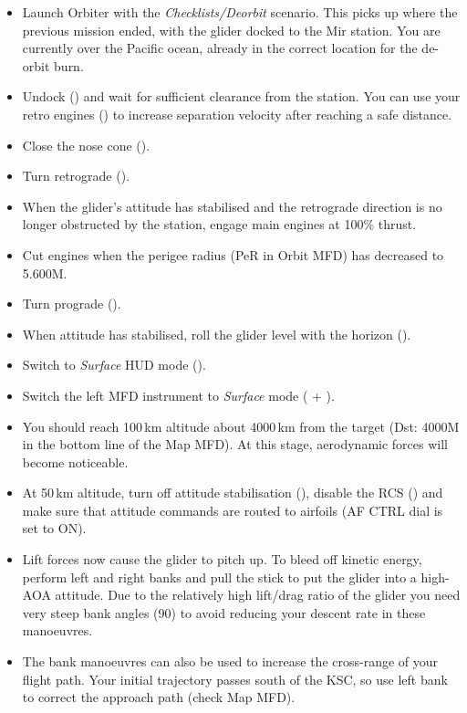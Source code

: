 \documentclass[Orbiter User Manual.tex]{subfiles}
\begin{document}
\begin{itemize}
	\item Launch Orbiter with the \emph{Checklists/Deorbit} scenario. This picks
		up where the previous mission ended, with the glider docked to the Mir
		station. You are currently over the Pacific ocean, already in the
		correct location for the de-orbit burn.
	\item Undock () and wait for sufficient clearance from
		the station. You can use your retro engines (\keystroke{-}\num{}) to
		increase separation velocity after reaching a safe distance.
	\item Close the nose cone ().
	\item Turn retrograde (\keystroke{]}).
	\item When the glider's attitude has stabilised and the retrograde direction
		is no longer obstructed by the station, engage main engines at 100\%
		thrust.
	\item Cut engines when the perigee radius (PeR in Orbit MFD) has decreased
		to 5.600M.
	\item Turn prograde (\keystroke{[}).
	\item When attitude has stabilised, roll the glider level with the horizon
		().
	\item Switch to \emph{Surface} HUD mode ().
	\item Switch the left MFD instrument to \emph{Surface} mode ( +
		).
	\item You should reach 100\,km altitude about 4000\,km from the target
		(Dst: 4000M in the bottom line of the Map MFD). At this stage,
		aerodynamic forces will become noticeable.
	\item At 50\,km altitude, turn off attitude stabilisation (),
		disable the RCS (\keystroke{/}\num{}) and make sure that attitude
		commands are routed to airfoils (AF CTRL dial is set to ON).
	\item Lift forces now cause the glider to pitch up. To bleed off kinetic
		energy, perform left and right banks and pull the stick to put the
		glider into a high-AOA attitude. Due to the relatively high lift/drag
		ratio of the glider you need very steep bank angles (90\deg{}) to avoid
		reducing your descent rate in these manoeuvres.
	\item The bank manoeuvres can also be used to increase the cross-range of
		your flight path. Your initial trajectory passes south of the KSC, so
		use left bank to correct the approach path (check Map MFD).

\end{itemize}
\end{document}

